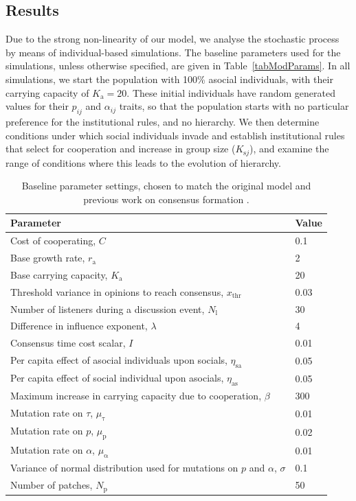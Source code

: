 \documentclass{rstb}
\begin{document}
\begin{linenumbers}
\section{Results}
Due to the strong non-linearity of our model, we analyse the stochastic process by means of individual-based simulations. The baseline parameters used for the simulations, unless otherwise specified, are given in Table~\ref{tabModParams}. In all simulations, we start the population with 100\% asocial individuals, with their carrying capacity of $K_\mathrm{a}=20$. These initial individuals have random generated values for their $p_{ij}$ and $\alpha_{ij}$ traits, so that the population starts with no particular preference for the institutional rules, and no hierarchy. We then determine conditions under which social individuals invade and establish institutional rules that select for cooperation and increase in group size ($K_{\mathrm{s}j}$), and examine the range of conditions where this leads to the evolution of hierarchy. 

\begin{table}[!p]
	\centering
	\caption{Baseline parameter settings, chosen to match the original model \cite{Powers:2013:a} and previous work on consensus formation \cite{Perret:2020:a}.}
		\begin{tabular}{|p{4.5in}|l|}
		\hline
		\textbf{Parameter} & \textbf{Value} \\ \hline
		Cost of cooperating, $C$ & 0.1 \\ \hline
		Base growth rate, $r_{\mathrm{a}}$ & 2 \\ \hline
            Base carrying capacity, $K_{\mathrm{a}}$ & 20 \\ \hline
            Threshold variance in opinions to reach consensus,  $x_\mathrm{thr}$ & 0.03 \\ \hline
            Number of listeners during a discussion event, $N_\mathrm{l}$ & 30 \\ \hline
            Difference in influence exponent, $\lambda$ & 4 \\ \hline
            Consensus time cost scalar, $I$ & 0.01 \\ \hline
		Per capita effect of asocial individuals upon socials, $\eta_{\mathrm{sa}}$ & 0.05 \\ \hline
		Per capita effect of social individual upon asocials, $\eta_{\mathrm{as}}$ & 0.05 \\ \hline
		Maximum increase in carrying capacity due to cooperation, $\beta$ & 300 \\ \hline
		Mutation rate on $\tau$, $\mu_\mathrm{\tau}$ & 0.01 \\ \hline
            Mutation rate on $p$, $\mu_\mathrm{p}$ & 0.02 \\ \hline
            Mutation rate on $\alpha$, $\mu_\mathrm{\alpha}$ & 0.01 \\ \hline
		Variance of normal distribution used for mutations on $p$ and $\alpha$, $\sigma$ & 0.1 \\ \hline
		Number of patches, $N_\mathrm{p}$ & 50 \\ \hline	
		\end{tabular}
	

\end{table}
\end{linenumbers}
\end{document}
